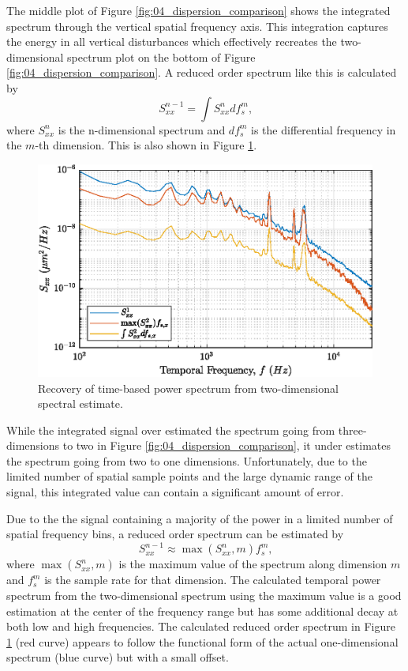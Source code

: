 The middle plot of Figure \ref{fig:04_dispersion_comparison} shows the integrated spectrum through the vertical spatial frequency axis.
This integration captures the energy in all vertical disturbances which effectively recreates the two-dimensional spectrum plot on the bottom of Figure \ref{fig:04_dispersion_comparison}.
A reduced order spectrum like this is calculated by
\begin{equation}
  S_{xx}^{n-1} = \int S_{xx}^n df_s^m \textrm{,}
\end{equation}
where $S_{xx}^n$ is the n-dimensional spectrum and $df_s^m$ is the differential frequency in the $m$-th dimension.
This is also shown in Figure \ref{fig:04_dispersion_max}.
\begin{figure}
  \centering
  \includegraphics{../matlab/04_dispersion_analysis/dispersion_max.eps}
  \caption{Recovery of time-based power spectrum from two-dimensional spectral estimate.}
  \label{fig:04_dispersion_max}
\end{figure}
While the integrated signal over estimated the spectrum going from three-dimensions to two in Figure \ref{fig:04_dispersion_comparison}, it under estimates the spectrum going from two to one dimensions.
Unfortunately, due to the limited number of spatial sample points and the large dynamic range of the signal, this integrated value can contain a significant amount of error.

Due to the the signal containing a majority of the power in a limited number of spatial frequency bins, a reduced order spectrum can be estimated by
\begin{equation}
  S_{xx}^{n-1} \approx \max(S_{xx}^n,m)f_s^m \textrm{,}
\end{equation}
where $\max(S_{xx}^n,m)$ is the maximum value of the spectrum along dimension $m$ and $f_s^m$ is the sample rate for that dimension.
The calculated temporal power spectrum from the two-dimensional spectrum using the maximum value is a good estimation at the center of the frequency range but has some additional decay at both low and high frequencies.
The calculated reduced order spectrum in Figure \ref{fig:04_dispersion_max} (red curve) appears to follow the functional form of the actual one-dimensional spectrum (blue curve) but with a small offset.

